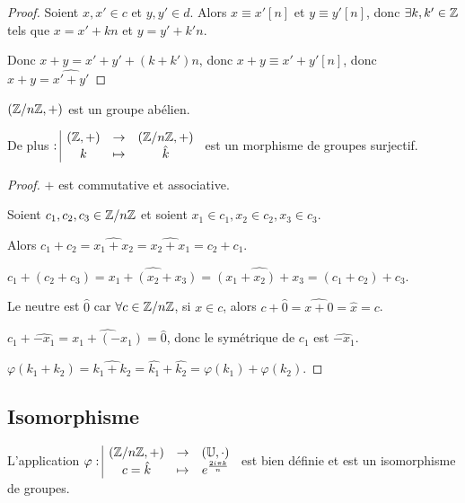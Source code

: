 \begin{proof}
    Soient $x, x' \in c$ et $y, y' \in d$.
    Alors $x \equiv x' [n]$ et $y \equiv y' [n]$, donc
    $\exists k, k' \in \mathbb{Z}$ tels que $x = x' + kn$ et $y = y' + k'n$.

    Donc $x + y = x' + y' + (k + k')n$, donc $x + y \equiv x' + y' [n]$,
    donc $\widehat{x + y} = \widehat{x' + y'}$
\end{proof}

\begin{theoreme}{}{}
    $(\mathbb{Z}/n\mathbb{Z}, +)$ est un groupe abélien.

    De plus $: \space \begin{array}{|ccc} \displaystyle (\mathbb{Z}, +) & \to & \displaystyle (\mathbb{Z}/n\mathbb{Z}, +) \\ \displaystyle k & \mapsto & \displaystyle \hat k \end{array}$ est un morphisme de groupes surjectif.
\end{theoreme}


\begin{proof}
    $+$ est commutative et associative. 

    Soient $c_1, c_2, c_3 \in \mathbb{Z}/n\mathbb{Z}$ et soient $x_1 \in c_1, x_2 \in c_2, x_3 \in c_3$.

    Alors $c_1 + c_2 = \widehat{x_1 + x_2} = \widehat{x_2 + x_1} = c_2 + c_1$.

    $c_1 + (c_2 + c_3) = \widehat{x_1 + (x_2 + x_3)} = \widehat{(x_1 + x_2) + x_3} = (c_1 + c_2) + c_3$.

    \avspace Le neutre est $\hat 0$ car $\forall c \in \mathbb{Z}/n\mathbb{Z}$, si $x \in c$, alors
    $c + \hat 0 = \widehat{x + 0} = \hat x = c$.

    \avspace $c_1 + \hat{-x_1} = \widehat{x_1 + (-x_1)} = \hat 0$, donc le symétrique de $c_1$ est $\hat{-x_1}$.

    \avspace $\varphi(k_1 + k_2) = \widehat{k_1 + k_2} = \hat{k_1} + \hat{k_2} = \varphi(k_1) + \varphi(k_2)$.
\end{proof}

\subsection{Isomorphisme }

\begin{theoreme}{}{}
    L'application $\varphi: \space \begin{array}{|ccc} \displaystyle (\mathbb{Z}/n\mathbb{Z}, +) & \to & \displaystyle (\mathbb U, \cdot) \\ \displaystyle c = \hat k & \mapsto & \displaystyle e^{\frac{2i\pi k} n} \end{array}$
    est bien définie et est un isomorphisme de groupes.
\end{theoreme}


